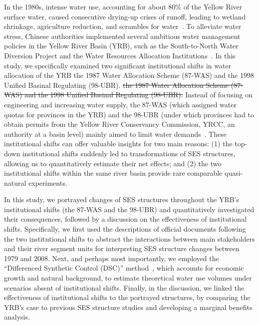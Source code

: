 \documentclass[preprint, 12pt]{elsarticle}
\providecommand{\DIFdeltex}[1]{{\protect\color{red}\sout{#1}}}                      %
\providecommand{\DIFdelbegin}{} %
\providecommand{\DIFdelend}{} %
\providecommand{\DIFdel}[1]{\texorpdfstring{\DIFdeltex{#1}}{}} %
\begin{document}
In the 1980s, intense water use, accounting for about $80\%$ of the Yellow River surface water, caused consecutive drying-up crises of runoff, leading to wetland shrinkage, agriculture reduction, and scrambles for water~\cite{wohlfart2016}.
To alleviate water stress, Chinese authorities implemented several ambitious water management policies in the Yellow River Basin (YRB), such as the South-to-North Water Diversion Project and the Water Resources Allocation Institutions~\cite{long2020, wang2019d}.
In this study, we specifically examined two significant institutional shifts in water allocation of the YRB\: the 1987 Water Allocation Scheme (87-WAS) and the 1998 Unified Basinal Regulating (98-UBR).
\DIFdelbegin \DIFdel{the 1987 Water Allocation Scheme (87-WAS) and the 1998 Unified Basinal Regulating (98-UBR).
}\DIFdelend Instead of focusing on engineering and increasing water supply, the 87-WAS (which assigned water quotas for provinces in the YRB) and the 98-UBR (under which provinces had to obtain permits from the Yellow River Conservancy Commission, YRCC, an authority at a basin level) mainly aimed to limit water demands~\cite{bouckaert2022, speed2013}.
These institutional shifts can offer valuable insights for two main reasons:
(1) the top-down institutional shifts suddenly led to transformations of SES structures, allowing us to quantitatively estimate their net effects; and (2) the two institutional shifts within the same river basin provide rare comparable quasi-natural experiments.

In this study, we portrayed changes of SES structures throughout the YRB's institutional shifts (the 87-WAS and the 98-UBR) and quantitatively investigated their consequences, followed by a discussion on the effectiveness of institutional shifts.
Specifically, we first used the descriptions of official documents following the two institutional shifts to abstract the interactions between main stakeholders and their river segment units for interpreting SES structure changes between 1979 and 2008.
Next, and perhaps most importantly, we employed the ``Differenced Synthetic Control (DSC)'' method~\cite{arkhangelsky2021}, which accounts for economic growth and natural background, to estimate theoretical water use volumes under scenarios absent of institutional shifts.
Finally, in the discussion, we linked the effectiveness of institutional shifts to the portrayed structures, by comparing the YRB's case to previous SES structure studies and developing a marginal benefits analysis.
\end{document}
